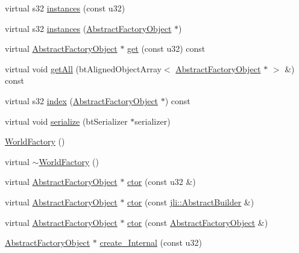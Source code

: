 \begin{DoxyCompactItemize}
\item 
virtual s32 \hyperlink{classjli_1_1_world_factory_a6305d49494b83a45f77c4065efe595d3}{instances} (const u32)
\item 
virtual s32 \hyperlink{classjli_1_1_world_factory_a352be79efeb80d15cf9e7c9cafc8d47a}{instances} (\hyperlink{namespacejli_aee55f3bcfb22fdfec10eadeec1618fec}{Abstract\+Factory\+Object} $\ast$)
\item 
virtual \hyperlink{namespacejli_aee55f3bcfb22fdfec10eadeec1618fec}{Abstract\+Factory\+Object} $\ast$ \hyperlink{classjli_1_1_world_factory_a44235d0cb9e7e11fa7df8b2c7c84e77b}{get} (const u32) const 
\item 
virtual void \hyperlink{classjli_1_1_world_factory_afc3c3ab16e547f8efb70df6c0a6c9acc}{get\+All} (bt\+Aligned\+Object\+Array$<$ \hyperlink{namespacejli_aee55f3bcfb22fdfec10eadeec1618fec}{Abstract\+Factory\+Object} $\ast$ $>$ \&) const 
\item 
virtual s32 \hyperlink{classjli_1_1_world_factory_a36ed5d3e23a486003b5490dbd117c308}{index} (\hyperlink{namespacejli_aee55f3bcfb22fdfec10eadeec1618fec}{Abstract\+Factory\+Object} $\ast$) const 
\item 
virtual void \hyperlink{classjli_1_1_world_factory_a4cb7bc0a2b06508944575416716a2630}{serialize} (bt\+Serializer $\ast$serializer)
\item 
\hyperlink{classjli_1_1_world_factory_aa0743bb8d687c225a725d68360c84cee}{World\+Factory} ()
\item 
virtual \hyperlink{classjli_1_1_world_factory_ab07df554e2f6d0777470dc426020ceeb}{$\sim$\+World\+Factory} ()
\item 
virtual \hyperlink{namespacejli_aee55f3bcfb22fdfec10eadeec1618fec}{Abstract\+Factory\+Object} $\ast$ \hyperlink{classjli_1_1_world_factory_a1651da687bf991ffafa8f02bc3eb9707}{ctor} (const u32 \&)
\item 
virtual \hyperlink{namespacejli_aee55f3bcfb22fdfec10eadeec1618fec}{Abstract\+Factory\+Object} $\ast$ \hyperlink{classjli_1_1_world_factory_a0b8a82380ee533205802acb2c58af331}{ctor} (const \hyperlink{classjli_1_1_abstract_builder}{jli\+::\+Abstract\+Builder} \&)
\item 
virtual \hyperlink{namespacejli_aee55f3bcfb22fdfec10eadeec1618fec}{Abstract\+Factory\+Object} $\ast$ \hyperlink{classjli_1_1_world_factory_a62f73f5ea8689adf2652de1111f05915}{ctor} (const \hyperlink{namespacejli_aee55f3bcfb22fdfec10eadeec1618fec}{Abstract\+Factory\+Object} \&)
\item 
\hyperlink{namespacejli_aee55f3bcfb22fdfec10eadeec1618fec}{Abstract\+Factory\+Object} $\ast$ \hyperlink{classjli_1_1_world_factory_a950011f467778776bffd2fe0a149293a}{create\+\_\+\+Internal} (const u32)

\end{DoxyCompactItemize}
